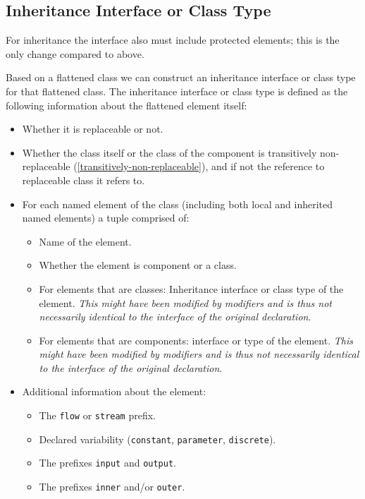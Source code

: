 \subsection{Inheritance Interface or Class Type}

For inheritance the interface also must include protected elements; this
is the only change compared to above.

Based on a flattened class we can construct an inheritance interface or
class type for that flattened class. The inheritance interface or class
type is defined as the following information about the flattened element
itself:
\begin{itemize}
\item
  Whether it is replaceable or not.
\item
  Whether the class itself or the class of the component is transitively
  non-replaceable (\autoref{transitively-non-replaceable}), and if not the reference to
  replaceable class it refers to.
\item
  For each named element of the class (including both local and
  inherited named elements) a tuple comprised of:
  \begin{itemize}
  \item
    Name of the element.
  \item
    Whether the element is component or a class.
  \item
    For elements that are classes: Inheritance interface or class type
    of the element. \emph{This might have been modified by modifiers and
    is thus not necessarily identical to the interface of the original
    declaration}.
  \item
    For elements that are components: interface or type of the element.
    \emph{This might have been modified by modifiers and is thus not
    necessarily identical to the interface of the original declaration}.
  \end{itemize}
\item
  Additional information about the element:
  \begin{itemize}
  \item
    The \lstinline!flow! or \lstinline!stream! prefix.
  \item
    Declared variability (\lstinline!constant!, \lstinline!parameter!, \lstinline!discrete!).
  \item
    The prefixes \lstinline!input! and \lstinline!output!.
  \item
    The prefixes \lstinline!inner! and/or \lstinline!outer!.

\end{itemize}
\end{itemize}
